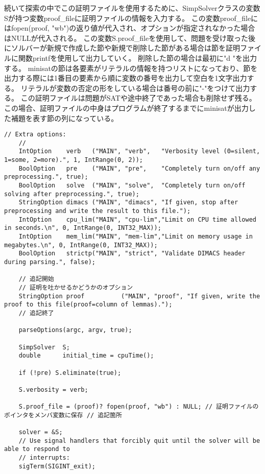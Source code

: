 続いて探索の中でこの証明ファイルを使用するために、SimpSolverクラスの変数Sが持つ変数proof\_fileに証明ファイルの情報を入力する。
この変数proof\_fileにはfopen(proof, "wb")の返り値が代入され、オプションが指定されなかった場合はNULLが代入される。
この変数S.proof\_fileを使用して、問題を受け取った後にソルバーが新規で作成した節や新規で削除した節がある場合は節を証明ファイルに関数printfを使用して出力していく。
削除した節の場合は最初に"d "を出力する。
minisatの節は各要素がリテラルの情報を持つリストになっており、節を出力する際には1番目の要素から順に変数の番号を出力して空白を1文字出力する。
リテラルが変数の否定の形をしている場合は番号の前に"-"をつけて出力する。
この証明ファイルは問題がSATや途中終了であった場合も削除せず残る。
この場合、証明ファイルの中身はプログラムが終了するまでにminisatが出力した補題を表す節の列になっている。
\begin{lstlisting}[caption=オプションを定義するための関数mainの変更(simp/Main.cc), firstnumber=60]
    // Extra options:
    //
    IntOption    verb   ("MAIN", "verb",   "Verbosity level (0=silent, 1=some, 2=more).", 1, IntRange(0, 2));
    BoolOption   pre    ("MAIN", "pre",    "Completely turn on/off any preprocessing.", true);
    BoolOption   solve  ("MAIN", "solve",  "Completely turn on/off solving after preprocessing.", true);
    StringOption dimacs ("MAIN", "dimacs", "If given, stop after preprocessing and write the result to this file.");
    IntOption    cpu_lim("MAIN", "cpu-lim","Limit on CPU time allowed in seconds.\n", 0, IntRange(0, INT32_MAX));
    IntOption    mem_lim("MAIN", "mem-lim","Limit on memory usage in megabytes.\n", 0, IntRange(0, INT32_MAX));
    BoolOption   strictp("MAIN", "strict", "Validate DIMACS header during parsing.", false);

    // 追記開始
    // 証明を吐かせるかどうかのオプション
    StringOption proof          ("MAIN", "proof", "If given, write the proof to this file(proof=column of lemmas).");
    // 追記終了

    parseOptions(argc, argv, true);
        
    SimpSolver  S;
    double      initial_time = cpuTime();

    if (!pre) S.eliminate(true);

    S.verbosity = verb;

    S.proof_file = (proof)? fopen(proof, "wb") : NULL; // 証明ファイルのポインタをメンバ変数に保存 // 追記箇所
        
    solver = &S;
    // Use signal handlers that forcibly quit until the solver will be able to respond to
    // interrupts:
    sigTerm(SIGINT_exit);
\end{lstlisting}
